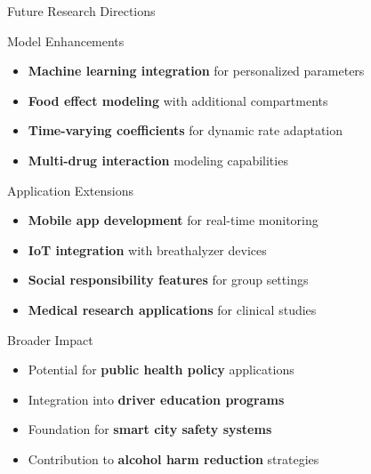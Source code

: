 \documentclass[aspectratio=169]{beamer}
\newcommand{\highlight}[1]{\textcolor{kentech_orange}{\textbf{#1}}}
\begin{document}
\begin{frame}{Future Research Directions}
    \begin{block}{Model Enhancements}
        \begin{itemize}
            \item \highlight{Machine learning integration} for personalized parameters
            \item \highlight{Food effect modeling} with additional compartments
            \item \highlight{Time-varying coefficients} for dynamic rate adaptation
            \item \highlight{Multi-drug interaction} modeling capabilities
        \end{itemize}
    \end{block}
    
    \begin{block}{Application Extensions}
        \begin{itemize}
            \item \highlight{Mobile app development} for real-time monitoring
            \item \highlight{IoT integration} with breathalyzer devices
            \item \highlight{Social responsibility features} for group settings
            \item \highlight{Medical research applications} for clinical studies
        \end{itemize}
    \end{block}
    
    \begin{block}{Broader Impact}
        \begin{itemize}
            \item Potential for \highlight{public health policy} applications
            \item Integration into \highlight{driver education programs}
            \item Foundation for \highlight{smart city safety systems}
            \item Contribution to \highlight{alcohol harm reduction} strategies
        \end{itemize}
    \end{block}
\end{frame}
\end{document}

